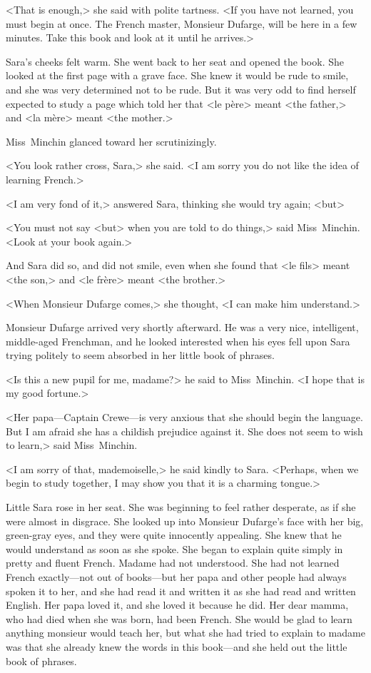 <That is enough,> she said with polite tartness. <If you have not learned, you must begin at once. The French master, Monsieur Dufarge, will be here in a few minutes. Take this book and look at it until he arrives.>

Sara's cheeks felt warm. She went back to her seat and opened the book. She looked at the first page with a grave face. She knew it would be rude to smile, and she was very determined not to be rude. But it was very odd to find herself expected to study a page which told her that <le père> meant <the father,> and <la mère> meant <the mother.>

Miss~Minchin glanced toward her scrutinizingly.

<You look rather cross, Sara,> she said. <I am sorry you do not like the idea of learning French.>

<I am very fond of it,> answered Sara, thinking she would try again; <but\longdash>

<You must not say <but> when you are told to do things,> said Miss~Minchin. <Look at your book again.>

And Sara did so, and did not smile, even when she found that <le fils> meant <the son,> and <le frère> meant <the brother.>

<When Monsieur Dufarge comes,> she thought, <I can make him understand.>

Monsieur Dufarge arrived very shortly afterward. He was a very nice, intelligent, middle-aged Frenchman, and he looked interested when his eyes fell upon Sara trying politely to seem absorbed in her little book of phrases.

<Is this a new pupil for me, madame?> he said to Miss~Minchin. <I hope that is my good fortune.>

<Her papa—Captain Crewe—is very anxious that she should begin the language. But I am afraid she has a childish prejudice against it. She does not seem to wish to learn,> said Miss~Minchin.

<I am sorry of that, mademoiselle,> he said kindly to Sara. <Perhaps, when we begin to study together, I may show you that it is a charming tongue.>

Little Sara rose in her seat. She was beginning to feel rather desperate, as if she were almost in disgrace. She looked up into Monsieur Dufarge's face with her big, green-gray eyes, and they were quite innocently appealing. She knew that he would understand as soon as she spoke. She began to explain quite simply in pretty and fluent French. Madame had not understood. She had not learned French exactly—not out of books—but her papa and other people had always spoken it to her, and she had read it and written it as she had read and written English. Her papa loved it, and she loved it because he did. Her dear mamma, who had died when she was born, had been French. She would be glad to learn anything monsieur would teach her, but what she had tried to explain to madame was that she already knew the words in this book—and she held out the little book of phrases.

